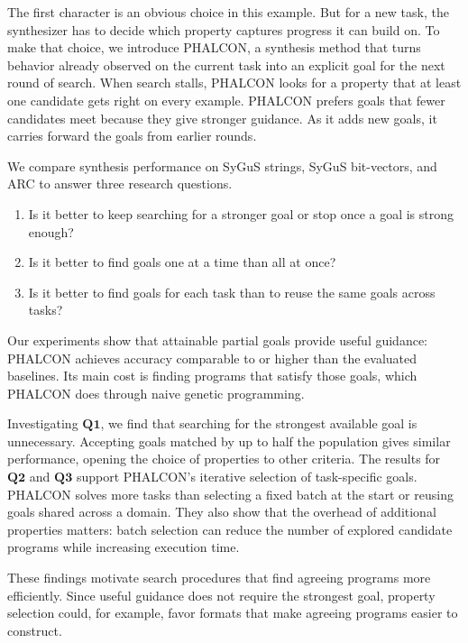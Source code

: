 \documentclass[letterpaper]{article} %
\begin{document}
The first character is an obvious choice in this example. But for a new
task, the synthesizer has to decide which property captures progress
it can build on. To make that choice, we introduce
PHALCON, a synthesis method that turns behavior already
observed on the current task into an explicit goal for the next round of
search. When search stalls, PHALCON looks for a property that at least
one candidate gets right on every example. PHALCON prefers goals that
fewer candidates meet because they give stronger guidance. As it adds
new goals, it carries forward the goals from earlier rounds.

We compare synthesis performance on SyGuS strings, SyGuS bit-vectors,
and ARC to answer three research questions.

\begin{enumerate}
    \item[\(\mathbf{Q1}\)] Is it better to keep searching for a stronger goal or stop
    once a goal is strong enough?
    \item[\(\mathbf{Q2}\)] Is it better to find goals one at a time than all at once?
    \item[\(\mathbf{Q3}\)] Is it better to find goals for each task than to reuse the same goals across tasks?
\end{enumerate}

Our experiments show that attainable partial goals provide useful
guidance: PHALCON achieves accuracy comparable to or higher than the
evaluated baselines. Its main cost is finding programs that satisfy
those goals, which PHALCON does through naive genetic programming.

Investigating \(\mathbf{Q1}\), we find that searching for the strongest
available goal is unnecessary. Accepting goals matched by up to half
the population gives similar performance, opening the choice of
properties to other criteria. The results for
\(\mathbf{Q2}\) and \(\mathbf{Q3}\) support PHALCON's iterative
selection of task-specific goals. PHALCON solves more tasks than selecting
a fixed batch at the start or reusing goals shared across a domain.
They also show that the overhead of additional properties matters:
batch selection can reduce the number of explored candidate programs while increasing
execution time.

These findings motivate search procedures that find agreeing programs
more efficiently. Since useful
guidance does not require the strongest goal, property selection could,
for example, favor formats that make agreeing programs easier to construct.
\end{document}
